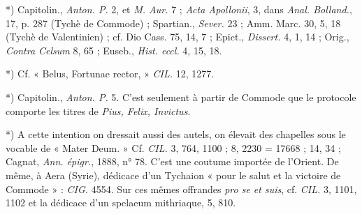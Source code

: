 \documentclass[a4paper, 11pt, oneside, polutonikogreek, french]{article}
\begin{document}
*) Capitolin., \emph{Anton. P.} 2, et \emph{M. Aur.} 7 ; \emph{Acta Apollonii}, 3, dans \emph{Anal. Bolland.}, 17, p. 287 (Tychè de Commode) ; Spartian., \emph{Sever.} 23 ; Amm. Marc. 30, 5, 18 (Tychè de Valentinien) ; cf. Dio Cass. 75, 14, 7 ; Epict., \emph{Dissert.} 4, 1, 14 ; Orig., \emph{Contra Celsum} 8, 65 ; Euseb., \emph{Hist. eccl.} 4, 15, 18.

*) Cf. « Belus, Fortunae rector, » \emph{CIL.} 12, 1277.

*) Capitolin., \emph{Anton. P.} 5. C'est seulement à partir de Commode que le protocole comporte les titres de \emph{Pius, Felix, Invictus}.

*) A cette intention on dressait aussi des autels, on élevait des chapelles sous le vocable de « Mater Deum. » Cf. \emph{CIL.} 3, 764, 1100 ; 8, 2230 = 17668 ; 14, 34 ; Cagnat, \emph{Ann. épigr.}, 1888, n° 78. C'est une coutume importée de l'Orient. De même, à Aera (Syrie), dédicace d'un Tychaion « pour le salut et la victoire de Commode » : \emph{CIG.} 4554. Sur ces mêmes offrandes \emph{pro se et suis}, cf. \emph{CIL.} 3, 1101, 1102 et la dédicace d'un spelaeum mithriaque, 5, 810.
\end{document}
